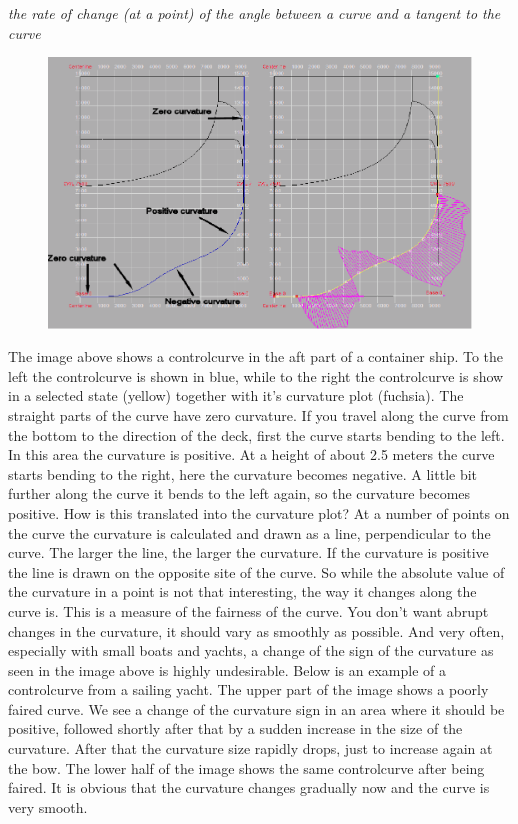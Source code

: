 \documentclass[12pt]{article}
\begin{document}
\begin{center}
\textit{the rate of change (at a point) of the angle between a curve and a tangent to the curve}
\end{center}

\begin{figure}[h]
        \centering
        \includegraphics[width=15cm,natwidth=1017,natheight=651]{curvature.png}
        \caption{}
        \label{fig:curvature}
\end{figure}

The image above shows a controlcurve in the aft part of a container
ship. To the left the controlcurve is shown in blue, while to the
right the controlcurve is show in a selected state (yellow) together
with it's curvature plot (fuchsia). The straight parts of the curve
have zero curvature. If you travel along the curve from the bottom to
the direction of the deck, first the curve starts bending to the
left. In this area the curvature is positive. At a height of about 2.5
meters the curve starts bending to the right, here the curvature
becomes negative. A little bit further along the curve it bends to the
left again, so the curvature becomes positive. How is this translated
into the curvature plot? At a number of points on the curve the
curvature is calculated and drawn as a line, perpendicular to the
curve. The larger the line, the larger the curvature. If the curvature
is positive the line is drawn on the opposite site of the curve. So
while the absolute value of the curvature in a point is not that
interesting, the way it changes along the curve is. This is a measure
of the fairness of the curve. You don't want abrupt changes in the
curvature, it should vary as smoothly as possible. And very often,
especially with small boats and yachts, a change of the sign of the
curvature as seen in the image above is highly undesirable. Below is
an example of a controlcurve from a sailing yacht. The upper part of
the image shows a poorly faired curve. We see a change of the
curvature sign in an area where it should be positive, followed
shortly after that by a sudden increase in the size of the
curvature. After that the curvature size rapidly drops, just to
increase again at the bow. The lower half of the image shows the same
controlcurve after being faired. It is obvious that the curvature
changes gradually now and the curve is very smooth.
\end{document}
